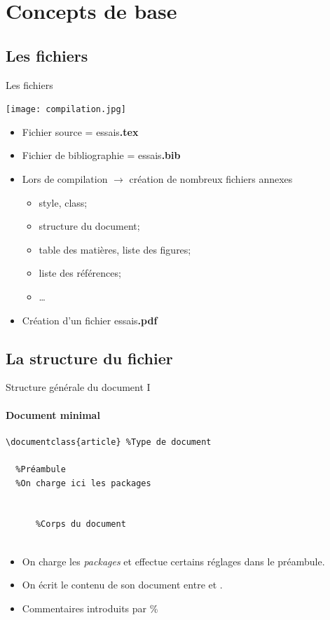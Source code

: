 \section{Concepts de base}

\subsection{Les fichiers}

\begin{frame}{Les fichiers}
    \begin{center}
        \texttt{[image: compilation.jpg]}
    \end{center}
    \begin{itemize}
        \item Fichier source = essais\alert{\textbf{.tex}}
        \item Fichier de bibliographie = essais\alert{\textbf{.bib}}
        \item Lors de compilation $\rightarrow$ création de nombreux fichiers annexes
        \begin{itemize}
            \item style, class;
            \item structure du document;
            \item table des matières, liste des figures;
            \item liste des références;
            \item \ldots{}
        \end{itemize}
        \item Création d'un fichier essais\alert{\textbf{.pdf}}
    \end{itemize}
\end{frame}

\subsection{La structure du fichier}

\begin{frame}[fragile]{Structure générale du document I}
  \framesubtitle{Document minimal}
  \small
  \begin{lstlisting}[style=nonumbers]
  \documentclass{article} %Type de document

  %Préambule
  %On charge ici les packages

  
      %Corps du document
  
  \end{lstlisting}
  \begin{itemize}
      \item On charge les \textit{packages} et effectue certains réglages dans le préambule.
      \item On écrit le contenu de son document entre \lstinline|| et \lstinline||.
      \item Commentaires introduits par \%
  \end{itemize}
\end{frame}

